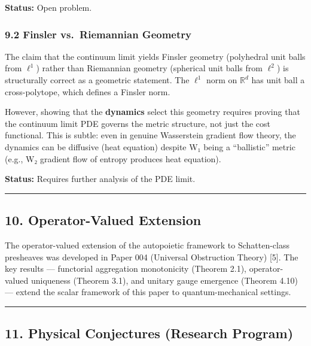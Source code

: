 \documentclass[
]{article}
\begin{document}
\textbf{Status:} Open problem.

\subsubsection{9.2 Finsler vs.~Riemannian
Geometry}\label{finsler-vs.-riemannian-geometry}

The claim that the continuum limit yields Finsler geometry (polyhedral
unit balls from \(\ell^1\)) rather than Riemannian geometry (spherical
unit balls from \(\ell^2\)) is structurally correct as a geometric
statement. The \(\ell^1\) norm on \(\mathbb{R}^d\) has unit ball a
cross-polytope, which defines a Finsler norm.

However, showing that the \textbf{dynamics} select this geometry
requires proving that the continuum limit PDE governs the metric
structure, not just the cost functional. This is subtle: even in genuine
Wasserstein gradient flow theory, the dynamics can be diffusive (heat
equation) despite W₁ being a ``ballistic'' metric (e.g., W₂ gradient
flow of entropy produces heat equation).

\textbf{Status:} Requires further analysis of the PDE limit.

\begin{center}\rule{0.5\linewidth}{0.5pt}\end{center}

\subsection{10. Operator-Valued
Extension}\label{operator-valued-extension}

The operator-valued extension of the autopoietic framework to
Schatten-class presheaves was developed in Paper 004 (Universal
Obstruction Theory) {[}5{]}. The key results --- functorial aggregation
monotonicity (Theorem 2.1), operator-valued uniqueness (Theorem 3.1),
and unitary gauge emergence (Theorem 4.10) --- extend the scalar
framework of this paper to quantum-mechanical settings.

\begin{center}\rule{0.5\linewidth}{0.5pt}\end{center}

\subsection{11. Physical Conjectures (Research
Program)}\label{physical-conjectures-research-program}
\end{document}
